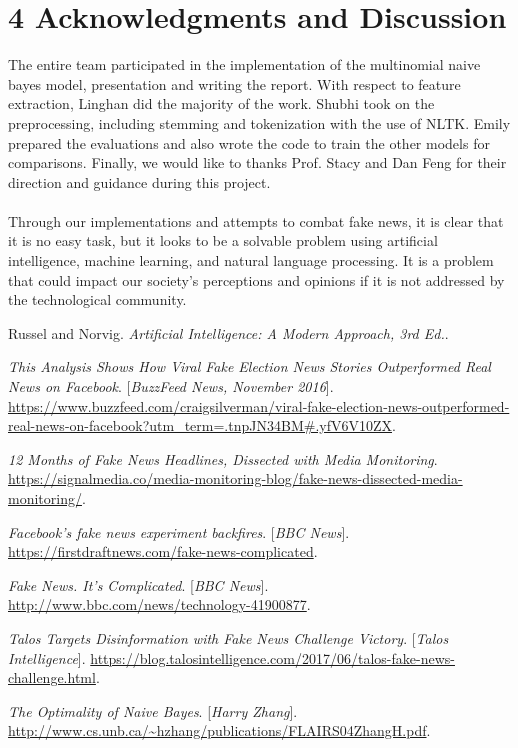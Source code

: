 \documentclass{neu_handout}
\begin{document}
\section*{4 Acknowledgments and Discussion}

The entire team participated in the implementation of the multinomial naive bayes model, presentation and writing the report. With respect to feature extraction, Linghan did the majority of the work. Shubhi took on the preprocessing, including stemming and tokenization with the use of NLTK. Emily prepared the evaluations and also wrote the code to train the other models for comparisons. Finally, we would like to thanks Prof. Stacy and Dan Feng for their direction and guidance during this project.
\\\\
Through our implementations and attempts to combat fake news, it is clear that it is no easy task, but it looks to be a solvable problem using artificial intelligence, machine learning, and natural language processing. It is a problem that could impact our society's perceptions and opinions if it is not addressed by the technological community.


\begin{thebibliography}{9}

Russel and Norvig. 
\textit{Artificial Intelligence: A Modern Approach, 3rd Ed.}. 

 
\textit{This Analysis Shows How Viral Fake Election News Stories Outperformed Real News on Facebook}.
[\textit{BuzzFeed News, November 2016}].
\url{https://www.buzzfeed.com/craigsilverman/viral-fake-election-news-outperformed-real-news-on-facebook?utm_term=.tnpJN34BM#.yfV6V10ZX}.
 

\textit{12 Months of Fake News Headlines, Dissected with Media Monitoring}. 
 \url{https://signalmedia.co/media-monitoring-blog/fake-news-dissected-media-monitoring/}.

\textit{Facebook's fake news experiment backfires}.
[\textit{BBC News}]. 
 \url{https://firstdraftnews.com/fake-news-complicated}.
 
 
\textit{Fake News. It's Complicated}.
[\textit{BBC News}]. 
 \url{http://www.bbc.com/news/technology-41900877}.
 
\textit{Talos Targets Disinformation with Fake News Challenge Victory}.
[\textit{Talos Intelligence}]. 
 \url{https://blog.talosintelligence.com/2017/06/talos-fake-news-challenge.html}.
 
\textit{The Optimality of Naive Bayes}.
[\textit{Harry Zhang}]. 
 \url{http://www.cs.unb.ca/~hzhang/publications/FLAIRS04ZhangH.pdf}.

\end{thebibliography}
\end{document}
